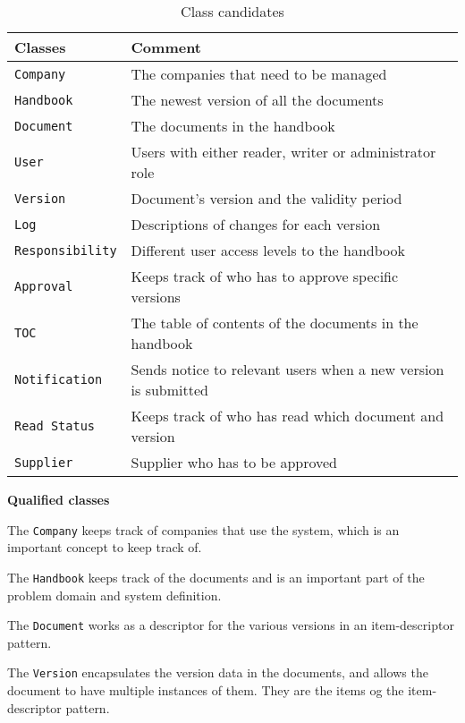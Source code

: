\begin{table} [H]
\begin{tabular}{l l}
	\hline
	Classes & Comment\\
	\hline
	\texttt{Company} & The companies that need to be managed \\
	\texttt{Handbook} & The newest version of all the documents\\
	\texttt{Document} & The documents in the handbook\\
	\texttt{User }& Users with either reader, writer or administrator role\\
	\texttt{Version} & Document’s version and the validity period\\
	\texttt{Log} & Descriptions of changes for each version\\
	\texttt{Responsibility} & Different user access levels to the handbook\\
	\texttt{Approval} & Keeps track of who has to approve specific
	versions\\
	\texttt{TOC} & The table of contents of the documents in the handbook\\
	\texttt{Notification} & Sends notice to relevant users when a new version is submitted\\
	\texttt{Read Status} & Keeps track of who has read which document and version\\
	\texttt{Supplier} & Supplier who has to be approved \\
	\hline
\end{tabular}
\caption{Class candidates}\label{tab:ClassCandidates}
\end{table}

\textbf{Qualified classes}

The \texttt{Company} keeps track of companies that use the system, which is an important concept to keep track of.

The \texttt{Handbook} keeps track of the documents and is an important part of the problem domain and system definition.

The \texttt{Document} works as a descriptor for the various versions in an item-descriptor pattern.

The \texttt{Version} encapsulates the version data in the documents, and allows the document to have multiple instances of them.
They are the items og the item-descriptor pattern.

